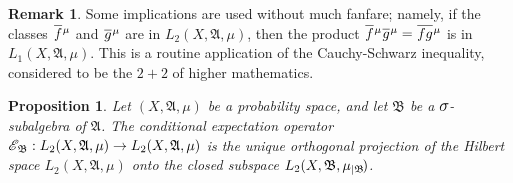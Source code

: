 \documentclass[
twoside=true,
paper=letter,
fontsize=9pt,
pagesize=auto,
leqno,
openany,
headsepline,
overfullrule,
]{scrbook}
\theoremstyle{plain}
\theoremstyle{plain}
\newtheorem{prop}[thm]{Proposition}
\theoremstyle{definition}
\newtheorem{rmk}[thm]{Remark}
\theoremstyle{bfnoteitalic}
\theoremstyle{bfnoteroman}
\newcommand{\sigalg}[1]{\mathfrak{#1}}
\newcommand{\cali}[1]{\mathscr{#1}}
\newcommand{\condexpop}[1]{\mathop{\cali{E}\hspace{-1pt}}\nolimits_{#1}}
\newcommand{\textsigma}{\hbox{\large{$\sigma$}}\kern-1pt}
\newcommand{\restrictedto}[1]{_{\lvert#1}\kern-1.5pt}
\newcommand{\sigmaalgebra}{\sigalg{A}}
\newcommand{\sigmaalgebraii}{\sigalg{B}}
\newcommand{\function}{f}
\newcommand{\functionii}{g}
\newcommand{\measurespace}{X}
\newcommand{\measure}{\mu}
\newcommand*\xbar[1]{%
   \hbox{%
     \vbox{%
       \hrule height 0.4pt %
       \kern0.4ex%
       \hbox{%
         \ensuremath{#1}%
       }%
     }%
   }%
}
\newcommand{\lebclass}[1]{\hspace{.5pt}\xbar{#1}\hspace{0.5pt}}
\newcommand{\ellclass}[2]{\lebclass{#1}^{#2}}
\begin{document}
\begin{rmk}
Some implications are used without much fanfare; namely, if the classes $\ellclass{\function}{\measure}$ and 
$\ellclass{\functionii}{\measure}$ are in 
$L_2(\measurespace, \sigmaalgebra,\measure)$, then the product 
$\ellclass{\function}{\measure}\ellclass{\functionii}{\measure} 
= \ellclass{\function\functionii}{\measure}$ is in 
$L_1(\measurespace, \sigmaalgebra,\measure)$. This is a routine application of the Cauchy-Schwarz inequality, considered to be the $2+2$ of higher mathematics.
\end{rmk}




\begin{prop}\label{projection_proposition}
Let $(\measurespace, \sigmaalgebra,\measure)$ be a  probability space, and let 
$\sigmaalgebraii$ be a $\textsigma$-subalgebra of $\sigmaalgebra$.
The conditional expectation operator 
$
\condexpop{\sigmaalgebraii}:
L_2(\measurespace, \sigmaalgebra,\measure)\to
L_2(\measurespace, \sigmaalgebra,\measure)
$ 
is  the unique orthogonal projection of the Hilbert space $L_2(\measurespace, \sigmaalgebra,\measure)$ onto the closed subspace $L_2(\measurespace, \sigmaalgebraii,\measure\restrictedto{\sigmaalgebraii})$.
\end{prop}
\end{document}
